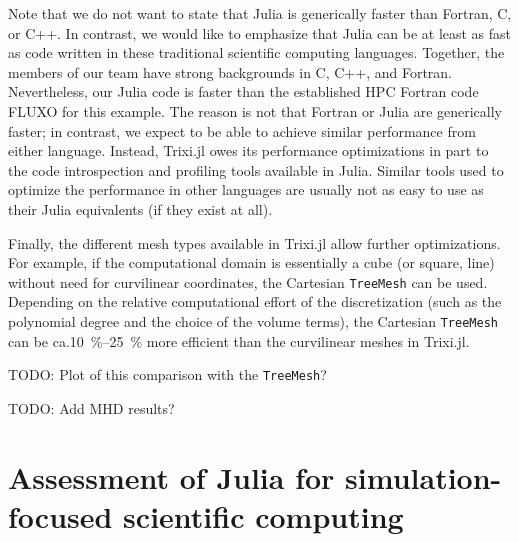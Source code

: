 \documentclass{juliacon}
\makeatletter
\newcommand{\ca}[0]{{ca.\@}\xspace}
\newcommand{\trixi}{Trixi.jl\xspace}
\newcommand{\todo}[1]{{\color{red}#1}}
\makeatother
\begin{document}
Note that we do not want to state that Julia is generically faster than Fortran,
C, or C++. In contrast, we would like to emphasize that Julia can be at least
as fast as code written in these traditional scientific computing languages.
Together, the members of our team have strong backgrounds in C, C++, and 
Fortran. Nevertheless, our Julia code is faster than the established HPC Fortran 
code FLUXO for this example. The reason is not that Fortran or Julia are generically 
faster; in contrast, we expect to be able to achieve similar performance from either 
language. Instead, \trixi owes its performance optimizations in part to the code 
introspection and profiling tools available in Julia. Similar tools used to optimize the 
performance in other languages are usually not as easy to use as their Julia 
equivalents (if they exist at all).


Finally, the different mesh types available in \trixi allow further optimizations.
For example, if the computational domain is essentially a cube (or square, line)
without need for curvilinear coordinates, the Cartesian \lstinline{TreeMesh} can
be used. Depending on the relative computational effort of the discretization
(such as the polynomial degree and the choice of the volume terms), the
Cartesian \lstinline{TreeMesh} can be \ca \SI{10}{\percent}--\SI{25}{\percent}
more efficient than the curvilinear meshes in \trixi.

\todo{TODO: Plot of this comparison with the \lstinline{TreeMesh}?}

\todo{TODO: Add MHD results?}



\section{Assessment of Julia for simulation-focused scientific computing}
\label{sec:assessment-of-julia}
\end{document}
